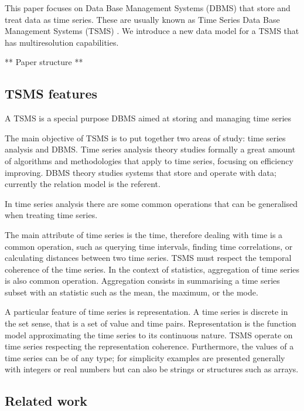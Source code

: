 
This paper focuses on Data Base Management Systems (DBMS) that store
and treat data as time series. These are usually known as Time Series
Data Base Management Systems (TSMS) \cite{dreyer94}.  We introduce a
new data model for a TSMS that has multiresolution capabilities.


** Paper structure **\todo{}



\subsection{TSMS features}

A TSMS is a special purpose DBMS aimed at storing and managing time
series

The main objective of TSMS is to put together two areas of study: time
series analysis and DBMS.  Time series analysis theory studies
formally a great amount of algorithms and methodologies that apply to
time series, focusing on efficiency improving. DBMS theory studies
systems that store and operate with data; currently the relation model
\cite{date:introduction} is the referent.

In time series analysis there are some common operations that can be
generalised when treating time series.

The main attribute of time series is the time, therefore dealing with
time is a common operation, such as querying time intervals, finding
time correlations, or calculating distances between two time
series. TSMS must respect the temporal coherence of the time series.
In the context of statistics, aggregation of time series is also
common operation. Aggregation consists in summarising a time series
subset with an statistic such as the mean, the maximum, or the mode.

A particular feature of time series is representation. A time series
is discrete in the set sense, that is a set of value and time
pairs. Representation is the function model approximating the time
series to its continuous nature. TSMS operate on time series
respecting the representation coherence. Furthermore, the values of a
time series can be of any type; for simplicity examples are presented
generally with integers or real numbers but can also be strings or
structures such as arrays.


\subsection{Related work}

